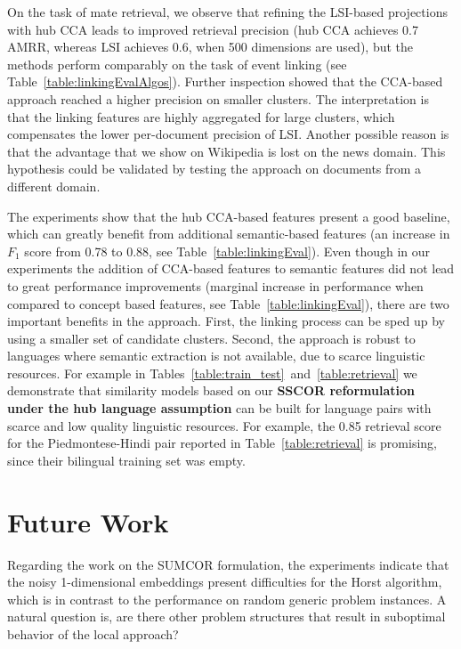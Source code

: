 On the task of mate retrieval, we observe that refining the LSI-based
projections with hub CCA leads to improved retrieval precision (hub CCA
achieves 0.7 AMRR, whereas LSI achieves 0.6, when 500 dimensions are used), but the
methods perform comparably on the task of event linking (see Table~\ref{table:linkingEvalAlgos}).
Further inspection showed that the CCA-based approach reached a higher precision on smaller
clusters. The interpretation is that the linking features are highly
aggregated for large clusters, which compensates the lower per-document
precision of LSI. Another possible reason is that the advantage that we
show on Wikipedia is lost on the news domain. This hypothesis could be
validated by testing the approach on documents from a different domain.

The experiments show that the hub CCA-based features present a good baseline,
which can greatly benefit from additional semantic-based features (an increase
in $F_1$ score from 0.78 to 0.88, see Table~\ref{table:linkingEval}).
Even though in our experiments the addition of CCA-based features to semantic features did not
lead to great performance improvements (marginal increase in performance when compared
to concept based features, see Table~\ref{table:linkingEval}), there are two important benefits in the
approach. First, the linking process can be sped up by using a smaller set of
candidate clusters. Second, the approach is robust to languages where semantic
extraction is not available, due to scarce linguistic resources.
For example in Tables~\ref{table:train_test}~and~\ref{table:retrieval} we demonstrate
that similarity models based on our \textbf{SSCOR reformulation under the hub language
assumption} can be built for language pairs with scarce and
low quality linguistic resources. For example, the 0.85 retrieval score
for the Piedmontese-Hindi pair reported in Table~\ref{table:retrieval} is
promising, since their bilingual training set was empty.

\section{Future Work}

Regarding the work on the SUMCOR formulation, the experiments indicate
that the noisy 1-dimensional embeddings present difficulties for the Horst
algorithm, which is in contrast to the performance on random generic problem instances. A natural
question is, are there other problem structures that result in suboptimal behavior of the local approach?

